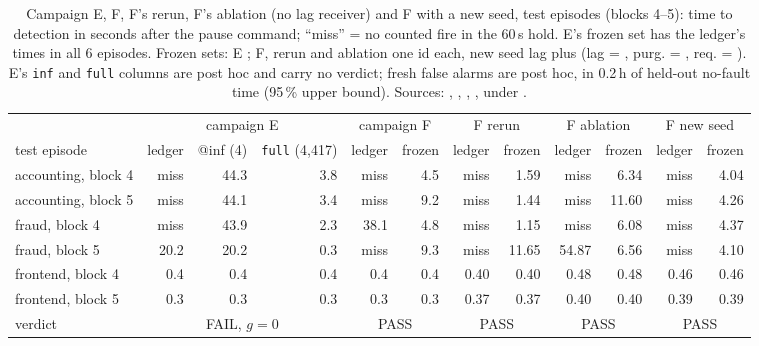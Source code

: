 \documentclass{ceurart}
\begin{document}
\begin{table}[t]
\caption{Campaign E, F, F's rerun, F's ablation (no lag receiver) and F with a new seed, test episodes (blocks 4--5): time to detection in
seconds after the pause command; ``miss'' = no counted fire in the 60\,s hold. E's frozen set has the ledger's times in all
6 episodes. Frozen sets: E \protect{}; F, rerun and ablation one
\protect{} id each, new seed lag plus \protect{} (lag = \protect{}, purg. = \protect{},
req. = \protect{}). E's \texttt{inf} and \texttt{full} columns are post hoc and carry no verdict;
fresh false alarms are post hoc, in 0.2\,h of held-out no-fault time (95\,\% upper bound). Sources:
\protect{}, \protect{}, \protect{}, \protect{}, \protect{} under
\protect{}.}
\label{tab:e}
\footnotesize
\setlength{\tabcolsep}{3pt}
\begin{tabular}{@{}lrrrrrrrrrrr@{}}
\toprule
 & \multicolumn{3}{c}{campaign E} & \multicolumn{2}{c}{campaign F} & \multicolumn{2}{c}{F rerun} & \multicolumn{2}{c}{F ablation} & \multicolumn{2}{c}{F new seed} \\
\cmidrule(lr){2-4}\cmidrule(lr){5-6}\cmidrule(lr){7-8}\cmidrule(lr){9-10}\cmidrule(l){11-12}
test episode & ledger & @inf (4) & \texttt{full} (4,417) & ledger & frozen & ledger & frozen & ledger & frozen & ledger & frozen \\
\midrule
accounting, block 4 & miss & 44.3 & 3.8 & miss & 4.5 & miss & 1.59 & miss & 6.34 & miss & 4.04 \\
accounting, block 5 & miss & 44.1 & 3.4 & miss & 9.2 & miss & 1.44 & miss & 11.60 & miss & 4.26 \\
fraud, block 4 & miss & 43.9 & 2.3 & 38.1 & 4.8 & miss & 1.15 & miss & 6.08 & miss & 4.37 \\
fraud, block 5 & 20.2 & 20.2 & 0.3 & miss & 9.3 & miss & 11.65 & 54.87 & 6.56 & miss & 4.10 \\
frontend, block 4 & 0.4 & 0.4 & 0.4 & 0.4 & 0.4 & 0.40 & 0.40 & 0.48 & 0.48 & 0.46 & 0.46 \\
frontend, block 5 & 0.3 & 0.3 & 0.3 & 0.3 & 0.3 & 0.37 & 0.37 & 0.40 & 0.40 & 0.39 & 0.39 \\
\midrule
verdict & \multicolumn{3}{c}{FAIL, $g = 0$} & \multicolumn{2}{c}{PASS} & \multicolumn{2}{c}{PASS} & \multicolumn{2}{c}{PASS} & \multicolumn{2}{c}{PASS} \\

\end{tabular}
\end{table}
\end{document}
